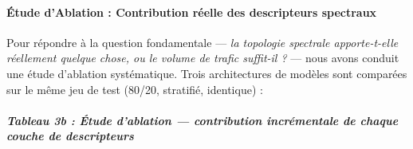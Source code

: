 \documentclass[10pt, a4paper]{article}
\begin{document}
\paragraph{Étude d'Ablation : Contribution réelle des descripteurs
spectraux}\label{uxe9tude-dablation-contribution-ruxe9elle-des-descripteurs-spectraux}

Pour répondre à la question fondamentale --- \emph{la topologie
spectrale apporte-t-elle réellement quelque chose, ou le volume de
trafic suffit-il ?} --- nous avons conduit une étude d'ablation
systématique. Trois architectures de modèles sont comparées sur le même
jeu de test (80/20, stratifié, identique) :

\subparagraph{Tableau 3b : Étude d'ablation --- contribution
incrémentale de chaque couche de
descripteurs}\label{tableau-3b-uxe9tude-dablation-contribution-incruxe9mentale-de-chaque-couche-de-descripteurs}
\end{document}
